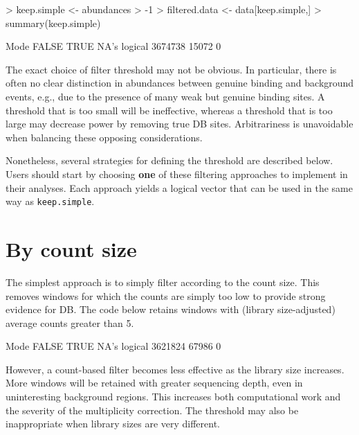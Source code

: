 \documentclass[12pt]{report}
\renewenvironment{Schunk}{\vspace{0pt}}{\vspace{0pt}}
\newcommand{\code}[1]{{\small\texttt{#1}}}
\begin{document}
\begin{Schunk}
\begin{Sinput}
> keep.simple <- abundances > -1
> filtered.data <- data[keep.simple,]
> summary(keep.simple)
\end{Sinput}
\begin{Soutput}
   Mode   FALSE    TRUE    NA's 
logical 3674738   15072       0 
\end{Soutput}
\end{Schunk}

The exact choice of filter threshold may not be obvious.
In particular, there is often no clear distinction in abundances between genuine binding and background events, e.g., due to the presence of many weak but genuine binding sites.
A threshold that is too small will be ineffective, whereas a threshold that is too large may decrease power by removing true DB sites.
Arbitrariness is unavoidable when balancing these opposing considerations.

Nonetheless, several strategies for defining the threshold are described below.
Users should start by choosing \textbf{one} of these filtering approaches to implement in their analyses.
Each approach yields a logical vector that can be used in the same way as \code{keep.simple}.

\section{By count size}
The simplest approach is to simply filter according to the count size.
This removes windows for which the counts are simply too low to provide strong evidence for DB.
The code below retains windows with (library size-adjusted) average counts greater than 5. 

\begin{Schunk}
\begin{Soutput}
   Mode   FALSE    TRUE    NA's 
logical 3621824   67986       0 
\end{Soutput}
\end{Schunk}

However, a count-based filter becomes less effective as the library size increases.
More windows will be retained with greater sequencing depth, even in uninteresting background regions.
This increases both computational work and the severity of the multiplicity correction.
The threshold may also be inappropriate when library sizes are very different.
\end{document}

